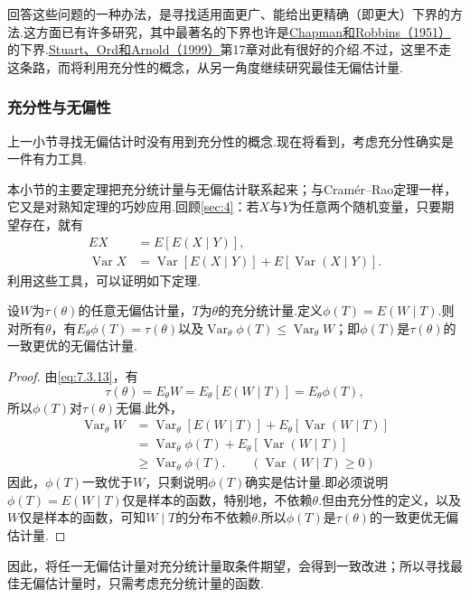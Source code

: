 回答这些问题的一种办法，是寻找适用面更广、能给出更精确（即更大）下界的方法.这方面已有许多研究，其中最著名的下界也许是\hyperref[bib:source72]{Chapman和Robbins（1951）}的下界.\hyperref[bib:source311]{Stuart、Ord和Arnold（1999）}第17章对此有很好的介绍.不过，这里不走这条路，而将利用充分性的概念，从另一角度继续研究最佳无偏估计量.
\subsubsection{充分性与无偏性}\label{sec:7.3.3}
上一小节寻找无偏估计时没有用到充分性的概念.现在将看到，考虑充分性确实是一件有力工具.

本小节的主要定理把充分统计量与无偏估计联系起来；与Cramér--Rao定理一样，它又是对熟知定理的巧妙应用.回顾\autoref{sec:4}：若$X$与$Y$为任意两个随机变量，只要期望存在，就有
\begin{equation}\label{eq:7.3.13}
\begin{aligned}
EX&=E[E(X\mid Y)],\\
\operatorname{Var}X&=\operatorname{Var}[E(X\mid Y)]+E[\operatorname{Var}(X\mid Y)].
\end{aligned}
\end{equation}
利用这些工具，可以证明如下定理.
\begin{theorem}\label{thm:7.3.17}
设$W$为$\tau(\theta)$的任意无偏估计量，$T$为$\theta$的充分统计量.定义$\phi(T)=E(W\mid T)$.则对所有$\theta$，有$E_\theta\phi(T)=\tau(\theta)$以及$\operatorname{Var}_\theta\phi(T)\le\operatorname{Var}_\theta W$；即$\phi(T)$是$\tau(\theta)$的一致更优的无偏估计量.
\end{theorem}
\begin{proof}
由\eqref{eq:7.3.13}，有
$$\tau(\theta)=E_\theta W=E_\theta[E(W\mid T)]=E_\theta\phi(T),$$
所以$\phi(T)$对$\tau(\theta)$无偏.此外，
\begin{align*}
\operatorname{Var}_\theta W&=\operatorname{Var}_\theta[E(W\mid T)]+E_\theta[\operatorname{Var}(W\mid T)]\\
&=\operatorname{Var}_\theta\phi(T)+E_\theta[\operatorname{Var}(W\mid T)]\\
&\ge\operatorname{Var}_\theta\phi(T).\qquad(\operatorname{Var}(W\mid T)\ge0)
\end{align*}
因此，$\phi(T)$一致优于$W$，只剩说明$\phi(T)$确实是估计量.即必须说明$\phi(T)=E(W\mid T)$仅是样本的函数，特别地，不依赖$\theta$.但由充分性的定义，以及$W$仅是样本的函数，可知$W\mid T$的分布不依赖$\theta$.所以$\phi(T)$是$\tau(\theta)$的一致更优无偏估计量.
\end{proof}
因此，将任一无偏估计量对充分统计量取条件期望，会得到一致改进；所以寻找最佳无偏估计量时，只需考虑充分统计量的函数.

